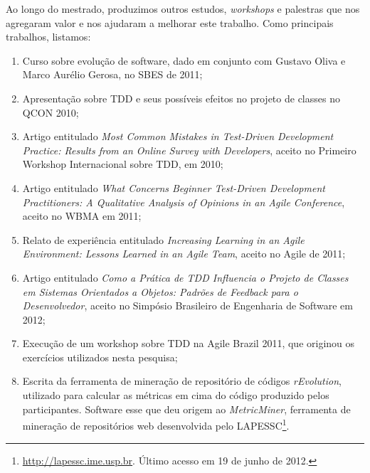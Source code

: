 Ao longo do mestrado, produzimos outros estudos, \textit{workshops} e palestras que 
nos agregaram valor e nos ajudaram a melhorar este trabalho. Como principais
trabalhos, listamos:

\begin{enumerate}
	
	\item Curso sobre evolução de software, dado em conjunto com Gustavo Oliva e
	Marco Aurélio Gerosa, no SBES de 2011;
	
	\item Apresentação sobre TDD e seus possíveis efeitos no projeto de classes no
	QCON 2010;
	
	\item Artigo entitulado \textit{Most Common Mistakes in Test-Driven Development Practice: Results from an Online Survey with Developers},
	aceito no Primeiro Workshop Internacional sobre TDD, em 2010;
	
	\item Artigo entitulado \textit{What Concerns Beginner Test-Driven Development Practitioners: A Qualitative Analysis of Opinions in an Agile Conference},
	aceito no WBMA em 2011;
	
	\item Relato de experiência entitulado \textit{Increasing Learning in an Agile Environment: Lessons Learned in an Agile Team}, aceito
	no Agile de 2011;
	
	\item Artigo entitulado \textit{Como a Prática de TDD Influencia o Projeto de Classes em Sistemas Orientados a Objetos: Padrões de Feedback para o Desenvolvedor}, aceito no Simpósio Brasileiro de Engenharia de Software em 2012;
	
	\item Execução de um workshop sobre TDD na Agile Brazil 2011, que originou os exercícios utilizados nesta pesquisa;
	
	\item Escrita da ferramenta de mineração de repositório de códigos \textit{rEvolution}, utilizado para calcular as métricas
	em cima do código produzido pelos participantes. Software esse que deu origem ao \textit{MetricMiner}, ferramenta de mineração
	de repositórios web desenvolvida pelo LAPESSC\footnote{\url{http://lapessc.ime.usp.br}. Último acesso em 19 de junho de 2012.}.
	
\end{enumerate}

